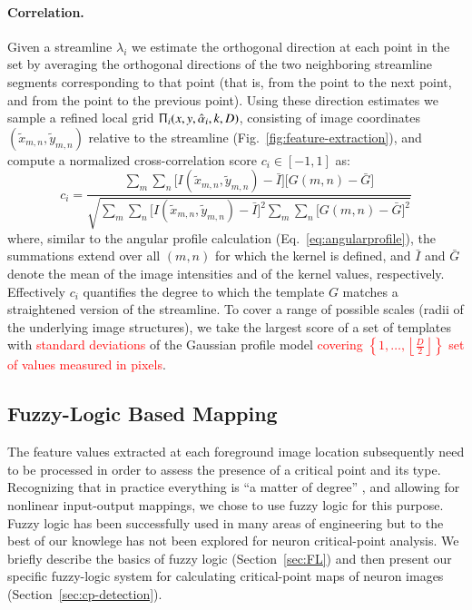 \documentclass[twocolumn,natbib]{svjour3}
\newcommand{\marked}[1]{\textcolor{red}{#1}}
\begin{document}
\paragraph{Correlation.} Given a streamline $\lambda_{i}$ we estimate the orthogonal direction at each point in the set by averaging the orthogonal directions of the two neighboring streamline segments corresponding to that point (that is, from the point to the next point, and from the point to the previous point). Using these direction estimates we sample a refined local grid $\Uppi_{i}(x,y,\hat{\alpha}_{i},k,D)$, consisting of image coordinates $(\tilde{x}_{m,n},\tilde{y}_{m,n})$ relative to the streamline (Fig.~\ref{fig:feature-extraction}), and compute a normalized cross-correlation \citep{lewis1995fast} score $c_{i}\in[-1,1]$ as:
\begin{equation} 
\label{eq:correlation}
c_{i} = \frac{\sum_{m}\sum_{n} \bigl[I(\tilde{x}_{m,n},\tilde{y}_{m,n})-\bar{I}\bigr] \bigl[G(m,n)-\bar{G}\bigr]}{\sqrt{\sum_{m}\sum_{n}\bigl[I(\tilde{x}_{m,n},\tilde{y}_{m,n})-\bar{I}\bigr]^{2}\sum_{m}\sum_{n}\bigl[G(m,n)-\bar{G}\bigr]^{2}}}
\end{equation}
where, similar to the angular profile calculation (Eq.~\ref{eq:angularprofile}), the summations extend over all $(m,n)$ for which the kernel is defined, and $\bar{I}$ and $\bar{G}$ denote the mean of the image intensities and of the kernel values, respectively. Effectively $c_{i}$ quantifies the degree to which the template $G$ matches a straightened version of the streamline. To cover a range of possible scales (radii of the underlying image structures), we take the largest score of a set of templates with \marked{standard deviations} of the Gaussian profile model \citep{su2012junction} \marked{covering $\left\lbrace 1,\dots,\left\lfloor{\frac{D}{2}}\right\rfloor\right\rbrace $ set of values measured in pixels}.

\subsection{Fuzzy-Logic Based Mapping}
\label{subsec:flrb-detection}
The feature values extracted at each foreground image location subsequently need to be processed in order to assess the presence of a critical point and its type. Recognizing that in practice everything is ``a matter of degree'' \citep{zadeh1975fuzzy}, and allowing for nonlinear input-output mappings, we chose to use fuzzy logic for this purpose. Fuzzy logic has been successfully used in many areas of engineering \citep{mendel1995fuzzy} but to the best of our knowlege has not been explored for neuron critical-point analysis. We briefly describe the basics of fuzzy logic (Section~\ref{sec:FL}) and then present our specific fuzzy-logic system for calculating critical-point maps of neuron images (Section~\ref{sec:cp-detection}).
\end{document}
